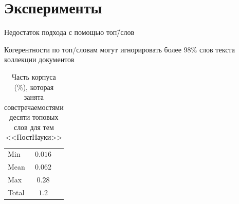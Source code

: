 \documentclass[russian]{beamer}
\begin{document}
\section{Эксперименты}


\begin{frame}{Недостаток подхода с помощью топ\=/слов}
  \begin{block}{}
    Когерентности по топ\=/словам могут игнорировать более 98\% слов текста коллекции документов
  \end{block}
  
  \bigskip
  
  \begin{table}[h]
    \centering
    \captionsetup{justification=centering}
    
    \begin{tabular}{lcc}
      \toprule
      Min & $0.016$\\%
      Mean & $0.062$\\%
      Max & $0.28$\\%
      \midrule
      Total & $\mathbf{1.2}$\\%
      \bottomrule
    \end{tabular}
    
    \caption*{Часть корпуса (\%), которая занята совстречаемостями десяти топовых слов для тем <<ПостНауки>>}
  \end{table}
\end{frame}
\end{document}
